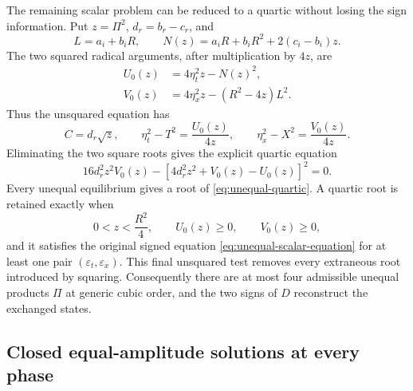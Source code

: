 The remaining scalar problem can be reduced to a quartic without losing the
sign information.  Put $z=\Pi^2$, $d_r=b_r-c_r$, and
\begin{equation}
 L=a_i+b_iR,
 \qquad
 N(z)=a_iR+b_iR^2+2(c_i-b_i)z.
 \label{eq:unequal-polynomial-shortcuts}
\end{equation}
The two squared radical arguments, after multiplication by $4z$, are
\begin{align}
 U_0(z)&=4\eta_t^2z-N(z)^2,
 \label{eq:unequal-U0}\\
 V_0(z)&=4\eta_x^2z-(R^2-4z)L^2.
 \label{eq:unequal-V0}
\end{align}
Thus the unsquared equation has
\begin{equation}
 C=d_r\sqrt z,
 \qquad
 \eta_t^2-T^2=\frac{U_0(z)}{4z},
 \qquad
 \eta_x^2-X^2=\frac{V_0(z)}{4z}.
 \label{eq:unequal-radical-arguments}
\end{equation}
Eliminating the two square roots gives the explicit quartic equation
\begin{equation}
 16d_r^2z^2V_0(z)
 -\left[4d_r^2z^2+V_0(z)-U_0(z)\right]^2=0.
 \label{eq:unequal-quartic}
\end{equation}
Every unequal equilibrium gives a root of \eqref{eq:unequal-quartic}.  A
quartic root is retained exactly when
\begin{equation}
 0<z<\frac{R^2}{4},
 \qquad U_0(z)\geq0,
 \qquad V_0(z)\geq0,
 \label{eq:unequal-quartic-filter}
\end{equation}
and it satisfies the original signed equation
\eqref{eq:unequal-scalar-equation} for at least one pair
$(\varepsilon_t,\varepsilon_x)$.  This final unsquared test removes every
extraneous root introduced by squaring.  Consequently there are at most four
admissible unequal products $\Pi$ at generic cubic order, and the two signs
of $D$ reconstruct the exchanged states.

\subsection{Closed equal-amplitude solutions at every phase}

